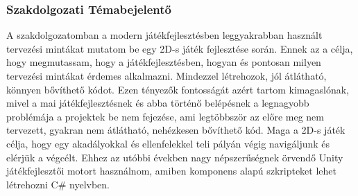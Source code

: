 \subsubsection{Szakdolgozati Témabejelentő}
A szakdolgozatomban a modern játékfejlesztésben leggyakrabban használt tervezési mintákat mutatom be egy 2D-s játék fejlesztése
során. Ennek az a célja, hogy megmutassam, hogy a játékfejlesztésben, hogyan és pontosan milyen tervezési mintákat érdemes
alkalmazni. Mindezzel létrehozok, jól átlátható, könnyen bővíthető kódot. Ezen tényezők fontosságát azért tartom kimagaslónak,
mivel a mai játékfejlesztésnek és abba történő belépésnek a legnagyobb problémája a projektek be nem fejezése, ami legtöbbször az
előre meg nem tervezett, gyakran nem átlátható, nehézkesen bővíthető kód. Maga a 2D-s játék célja, hogy egy akadályokkal és
ellenfelekkel teli pályán végig navigáljunk és elérjük a végcélt. Ehhez az utóbbi években nagy népszerűségnek örvendő Unity
játékfejlesztői motort használnom, amiben komponens alapú szkripteket lehet létrehozni C\# nyelvben.
